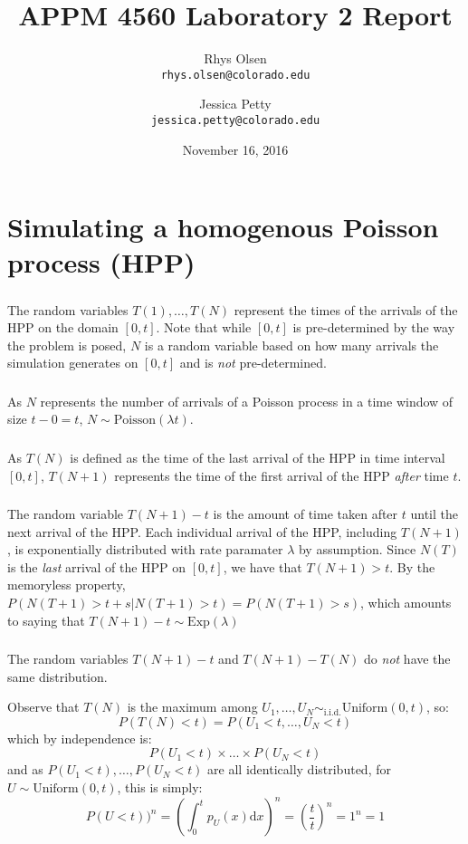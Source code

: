 \documentclass[11pt, oneside]{article}   	%
\title{APPM 4560 Laboratory 2 Report}
\author{Rhys Olsen\\
\texttt{rhys.olsen@colorado.edu}
 \and Jessica Petty\\
 \texttt{jessica.petty@colorado.edu}
 }
\date{November 16, 2016}
\begin{document}
\maketitle
\part{Simulating a homogenous Poisson process (HPP)}
\section{}
The random variables $T(1), \dots, T(N)$ represent the times of the arrivals of the HPP on the domain $[0, t]$. Note that while $[0, t]$ is pre-determined by the way the problem is posed, $N$ is a random variable based on how many arrivals the simulation generates on $[0, t]$ and is \emph{not} pre-determined.
\section{}
As $N$ represents the number of arrivals of a Poisson process in a time window of size $t - 0 = t$, $N \sim \text{Poisson}(\lambda t)$.
\section{}
As $T(N)$ is defined as the time of the last arrival of the HPP in time interval $[0, t]$, $T(N + 1)$ represents the time of the first arrival of the HPP \emph{after} time $t$.
\section{}
The random variable $T(N + 1) - t$ is the amount of time taken after $t$ until the next arrival of the HPP. Each individual arrival of the HPP, including $T(N + 1)$, is exponentially distributed with rate paramater $\lambda$ by assumption. Since $N(T)$ is the \emph{last} arrival of the HPP on $[0, t]$, we have that $T(N + 1) > t$. By the memoryless property, $P(N(T + 1) > t + s | N(T + 1) > t) = P(N(T + 1) > s)$, which amounts to saying that $T(N + 1) - t \sim \text{Exp}(\lambda)$
\section{}
The random variables $T(N + 1) - t$ and $T(N + 1) - T(N)$ do \emph{not} have the same distribution.

Observe that $T(N)$ is the maximum among $U_1, \dots, U_N \sim_{\text{i.i.d.}} \text{Uniform}(0, t)$, so:
$$P(T(N) < t) = P(U_1 < t, \dots, U_N < t)$$
which by independence is:
$$P(U_1 < t) \times \dots \times P(U_N < t)$$
and as $P(U_1 < t), \dots,  P(U_N < t)$ are all identically distributed, for $U \sim \text{Uniform}(0, t)$, this is simply:
$$P(U < t))^n = \left( \int_{0}^{t} p_U(x) \mathrm{d}x \right)^n = \left(\frac{t}{t}\right)^n = 1^n = 1$$
\end{document}
